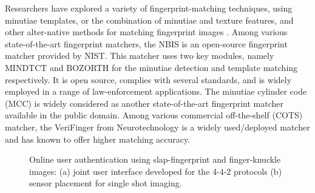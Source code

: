Researchers have explored a variety of fingerprint-matching techniques, using minutiae templates, or the combination of minutiae and texture features, and other alter-native methods for matching fingerprint images \cite{maltoni2009handbook}. Among various state-of-the-art fingerprint matchers, the NBIS \cite{watson2007user} is an open-source fingerprint matcher provided by NIST. This matcher uses two key modules, namely MINDTCT and BOZORTH for the minutiae detection and template matching respectively. It is open source, complies with several standards, and is widely employed in a range of law-enforcement applications. The minutiae cylinder code (MCC) \cite{cappelli2010minutia} is widely considered as another state-of-the-art fingerprint matcher available in the public domain. Among various commercial off-the-shelf (COTS) matcher, the VeriFinger from Neurotechnology \cite{verifinger} is a widely used/deployed matcher and has known to offer higher matching accuracy. 


\begin{figure}
    \centering
    \hspace{0.1in}
    \caption{Online user authentication using slap-fingerprint and finger-knuckle images: (a) joint user interface developed for the 4-4-2 protocols (b) sensor placement for single shot imaging.}
    \label{system}
\end{figure}

